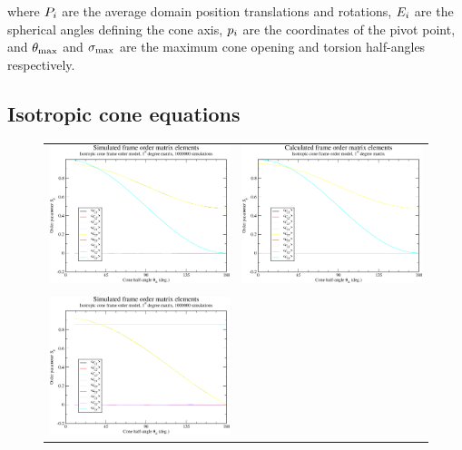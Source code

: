 where $P_i$ are the average domain position translations and rotations, $E_i$ are the spherical angles defining the cone axis, $p_i$ are the coordinates of the pivot point, and $\theta_\textrm{max}$ and $\sigma_\textrm{max}$ are the maximum cone opening and torsion half-angles respectively.




\subsection{Isotropic cone equations}

\begin{figure}
\centering
  \begin{tabular}{@{}cc@{}}
    \includegraphics[width=.5\textwidth]{images/frame_order_matrix/Sij_iso_cone_in_frame_theta_x_ens1000000.eps} &
    \includegraphics[width=.5\textwidth]{images/frame_order_matrix/Sij_iso_cone_in_frame_theta_x_calc.eps} \\
    \\[-5pt]
    \includegraphics[width=.5\textwidth]{images/frame_order_matrix/Sij_iso_cone_in_frame_theta_z_ens1000000.eps} &

\end{tabular}
\end{figure}
